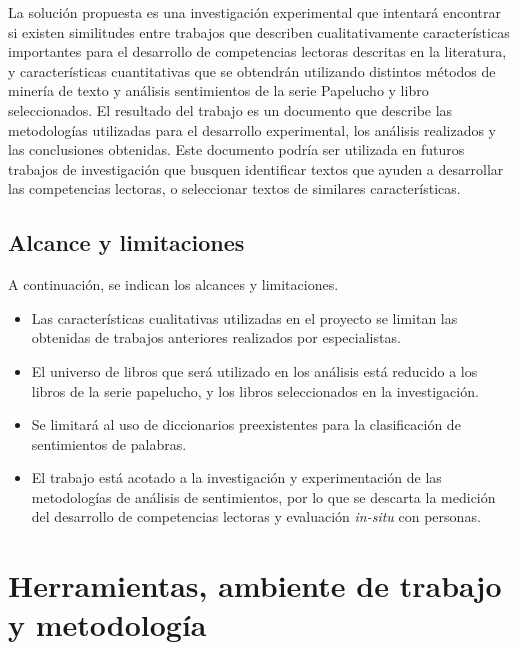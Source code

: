 La solución propuesta es una investigación experimental que intentará encontrar si existen similitudes entre trabajos que describen cualitativamente características importantes para el desarrollo de competencias lectoras descritas en la literatura, y características cuantitativas que se obtendrán utilizando distintos métodos de minería de texto y análisis sentimientos de la serie Papelucho y libro seleccionados.  El resultado del trabajo es un documento que describe las metodologías utilizadas para el desarrollo experimental, los análisis realizados
y las conclusiones obtenidas. Este documento podría ser utilizada en futuros
trabajos de investigación que busquen identificar textos que ayuden a desarrollar
las competencias lectoras, o seleccionar textos de similares características.

\section{Alcance y limitaciones}

A continuación, se indican los alcances y limitaciones.

\begin{itemize}
 \item Las características cualitativas utilizadas en el proyecto se limitan las obtenidas de trabajos anteriores realizados por especialistas.
 \item El universo de libros que será utilizado en los análisis está reducido a los libros de la serie papelucho, y los libros seleccionados en la investigación.
 \item Se limitará al uso de diccionarios preexistentes para la clasificación de sentimientos de palabras.
 \item El trabajo está acotado a la investigación y experimentación de las metodologías de análisis de sentimientos, por lo que se descarta la medición del desarrollo de competencias lectoras y evaluación \textit{in-situ} con personas.
\end{itemize}



    
\chapter{Herramientas, ambiente de trabajo y metodología}

